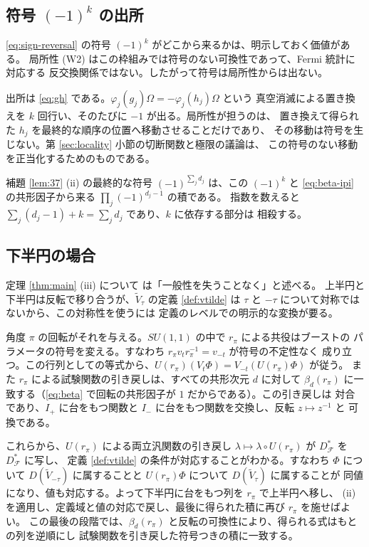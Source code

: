 \documentclass[11pt,a4paper]{article}
\newcommand{\Fields}{\mathcal{F}}
\newcommand{\Vt}{\widetilde{V}}
\newcommand{\Dom}{D}
\newcommand{\Dstar}{\Dom^{*}_{\Fields}}
\theoremstyle{definition}
\begin{document}
\subsection{\texorpdfstring{符号 $(-1)^k$ の出所}{符号 (-1)k の出所}}
\label{sec:sign}

\eqref{eq:sign-reversal} の符号 $(-1)^k$ がどこから来るかは、明示しておく価値がある。
局所性 (W2) はこの枠組みでは符号のない可換性であって、Fermi 統計に対応する
反交換関係ではない。したがって符号は局所性からは出ない。

出所は \eqref{eq:gh} である。$\varphi_j(g_j)\Omega = -\varphi_j(h_j)\Omega$ という
真空消滅による置き換えを $k$ 回行い、そのたびに $-1$ が出る。局所性が担うのは、
置き換えて得られた $h_j$ を最終的な順序の位置へ移動させることだけであり、
その移動は符号を生じない。第 \ref{sec:locality} 小節の切断関数と極限の議論は、
この符号のない移動を正当化するためのものである。

補題 \ref{lem:37} (ii) の最終的な符号 $(-1)^{\sum_j d_j}$ は、この $(-1)^k$ と
\eqref{eq:beta-ipi} の共形因子から来る $\prod_j (-1)^{d_j - 1}$ の積である。
指数を数えると $\sum_j (d_j - 1) + k = \sum_j d_j$ であり、$k$ に依存する部分は
相殺する。

\subsection{下半円の場合}
\label{sec:mirror}

定理 \ref{thm:main} (iii) について \cite{T26} は「一般性を失うことなく」と述べる。
上半円と下半円は反転で移り合うが、$\Vt_\tau$ の定義 \ref{def:vtilde} は
$\tau$ と $-\tau$ について対称ではないから、この対称性を使うには
定義のレベルでの明示的な変換が要る。

角度 $\pi$ の回転がそれを与える。$SU(1,1)$ の中で $r_\pi$ による共役はブーストの
パラメータの符号を変える。すなわち $r_\pi v_t r_\pi^{-1} = v_{-t}$ が符号の不定性なく
成り立つ。この行列としての等式から、$U(r_\pi)(V_t \Phi) = V_{-t}(U(r_\pi)\Phi)$ が従う。
また $r_\pi$ による試験関数の引き戻しは、すべての共形次元 $d$ に対して
$\beta_d(r_\pi)$ に一致する（\eqref{eq:beta} で回転の共形因子が $1$ だからである）。この引き戻しは
対合であり、$I_+$ に台をもつ関数と $I_-$ に台をもつ関数を交換し、反転 $z \mapsto z^{-1}$ と
可換である。

これらから、$U(r_\pi)$ による両立汎関数の引き戻し
$\lambda \mapsto \lambda \circ U(r_\pi)$ が $\Dstar$ を $\Dstar$ に写し、
定義 \ref{def:vtilde} の条件が対応することがわかる。すなわち $\Phi$ について
$\Dom(\Vt_{-\tau})$ に属することと $U(r_\pi)\Phi$ について $\Dom(\Vt_\tau)$ に属することが
同値になり、値も対応する。よって下半円に台をもつ列を $r_\pi$ で上半円へ移し、
(ii) を適用し、定義域と値の対応で戻し、最後に得られた積に再び $r_\pi$ を施せばよい。
この最後の段階では、$\beta_d(r_\pi)$ と反転の可換性により、得られる式はもとの列を逆順にし
試験関数を引き戻した符号つきの積に一致する。
\end{document}
